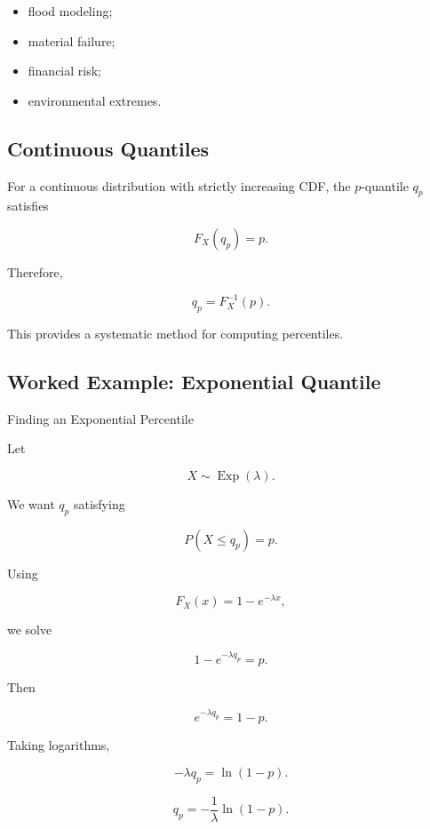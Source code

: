 \begin{itemize}
    \item flood modeling;
    \item material failure;
    \item financial risk;
    \item environmental extremes.
\end{itemize}

\subsection{Continuous Quantiles}
\label{subsec:continuous-quantiles}

For a continuous distribution with strictly increasing CDF, the
\(p\)-quantile \(q_p\) satisfies

\[
\boxed{
F_X(q_p)=p.
}
\]

Therefore,

\[
\boxed{
q_p=F_X^{-1}(p).
}
\]

This provides a systematic method for computing percentiles.

\subsection{Worked Example: Exponential Quantile}
\label{subsec:worked-exponential-quantile}

\begin{workedexamplebox}{Finding an Exponential Percentile}

Let

\[
X\sim\operatorname{Exp}(\lambda).
\]

We want \(q_p\) satisfying

\[
P(X\leq q_p)=p.
\]

Using

\[
F_X(x)=1-e^{-\lambda x},
\]

we solve

\[
1-e^{-\lambda q_p}=p.
\]

Then

\[
e^{-\lambda q_p}=1-p.
\]

Taking logarithms,

\[
-\lambda q_p
=
\ln(1-p).
\]

\begin{answerbox}
\[
\boxed{
q_p
=
-\frac{1}{\lambda}
\ln(1-p).
}
\]
\end{answerbox}

\end{workedexamplebox}

